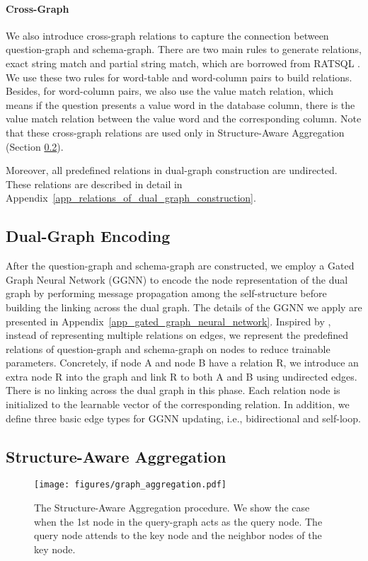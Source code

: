 \documentclass{article}
\begin{document}
\paragraph{Cross-Graph} We also introduce cross-graph relations to capture the connection between question-graph and schema-graph. There are two main rules to generate relations, exact string match and partial string match, which are borrowed from RATSQL \citep{wang2020rat}. We use these two rules for word-table and word-column pairs to build relations. Besides, for word-column pairs, we also use the value match relation, which means if the question presents a value word in the database column, there is the value match relation between the value word and the corresponding column.
Note that these cross-graph relations are used only in Structure-Aware Aggregation (Section \ref{structure_aware_aggregation}).

Moreover, all predefined relations in dual-graph construction are undirected. These relations are described in detail in Appendix~\ref{app_relations_of_dual_graph_construction}.

\subsection{Dual-Graph Encoding}
\label{dual_graph_encoding}
After the question-graph and schema-graph are constructed, we employ a Gated Graph Neural Network (GGNN) \citep{li2015gated} to encode the node representation of the dual graph by performing message propagation among the self-structure before building the linking across the dual graph. The details of the GGNN we apply are presented in Appendix~\ref{app_gated_graph_neural_network}. Inspired by \citet{beck2018graph}, instead of representing multiple relations on edges, we represent the predefined relations of question-graph and schema-graph on nodes to reduce trainable parameters. Concretely, if node A and node B have a relation R, we introduce an extra node R into the graph and link R to both A and B using undirected edges. There is no linking across the dual graph in this phase. Each relation node is initialized to the learnable vector of the corresponding relation. In addition, we define three basic edge types for GGNN updating, i.e., bidirectional and self-loop.

\subsection{Structure-Aware Aggregation}
\label{structure_aware_aggregation}
\begin{figure}
  \centering                
  \texttt{[image: figures/graph\_aggregation.pdf]} 
  \caption{The Structure-Aware Aggregation procedure.
  We show the case when the 1st node in the query-graph acts as the query node. The query node attends to the key node and the neighbor nodes of the key node.} 
  \label{graph_aggregation_figure}
\end{figure}
\end{document}
